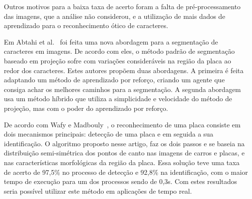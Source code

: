 Outros motivos para a baixa taxa de acerto foram a falta de pré-processamento
das imagens, que a análise não considerou, e a utilização de mais dados de
aprendizado para o reconhecimento ótico de caracteres.

Em Abtahi et al.~\cite{abtahi2015deep} foi feita uma nova abordagem para a segmentação de
caracteres em imagens. De acordo com eles, o método padrão de segmentação
baseado em projeção sofre com variações consideráveis na região da placa ao redor
dos caracteres. Estes autores propõem duas abordagens. A primeira é feita adaptando um método de
aprendizado por reforço, criando um agente que consiga achar os melhores caminhos para a segmentação. 
A segunda abordagem usa um método híbrido que utiliza a simplicidade e velocidade do método de projeção, 
mas com o poder do aprendizado por reforço.

De acordo com Wafy e Madbouly~\cite{wafy2016efficient}, o reconhecimento de uma placa consiste
em dois mecanismos principais: detecção de uma placa e em seguida a sua
identificação. O algoritmo proposto nesse artigo, faz os dois passos e
se baseia na distribuição semi-simétrica dos pontos de canto nas imagens de
carros e placas, e nas características morfológicas da região da placa. Essa
solução teve uma taxa de acerto de 97,5\% no processo de detecção e 92,8\% na
identificação, com o maior tempo de execução para um dos processos sendo de
0,3s. Com estes resultados seria possível utilizar este método em aplicações de tempo real.
